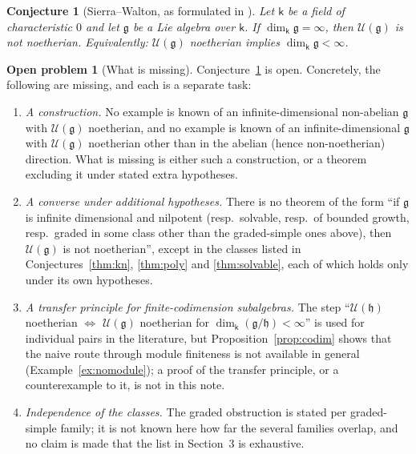 \documentclass[11pt]{ctexart}
\theoremstyle{plain}
\newtheorem{conjecture}[theorem]{Conjecture}
\theoremstyle{definition}
\newtheorem{openproblem}[theorem]{Open problem}
\theoremstyle{remark}
\newcommand{\kk}{\mathsf{k}}
\newcommand{\gl}{\mathfrak{g}}
\newcommand{\hl}{\mathfrak{h}}
\newcommand{\UU}{\mathcal{U}}
\begin{document}
\begin{conjecture}[Sierra--Walton, as formulated in \cite{SW14}]\label{conj:SW}
Let $\kk$ be a field of characteristic $0$ and let $\gl$ be a Lie algebra over $\kk$.
If $\dim_\kk\gl=\infty$, then $\UU(\gl)$ is not noetherian. Equivalently: $\UU(\gl)$
noetherian implies $\dim_\kk\gl<\infty$.
\end{conjecture}

\begin{openproblem}[What is missing]\label{op:missing}
Conjecture~\ref{conj:SW} is open. Concretely, the following are missing, and each is a
separate task:
\begin{enumerate}
\item[(1)] \emph{A construction.} No example is known of an infinite-dimensional
non-abelian $\gl$ with $\UU(\gl)$ noetherian, and no example is known of an
infinite-dimensional $\gl$ with $\UU(\gl)$ noetherian other than in the abelian
(hence non-noetherian) direction. What is missing is either such a construction, or a
theorem excluding it under stated extra hypotheses.
\item[(2)] \emph{A converse under additional hypotheses.} There is no theorem of the
form ``if $\gl$ is infinite dimensional and nilpotent (resp.\ solvable, resp.\ of
bounded growth, resp.\ graded in some class other than the graded-simple ones above),
then $\UU(\gl)$ is not noetherian'', except in the classes listed in
Conjectures~\ref{thm:kn}, \ref{thm:poly} and \ref{thm:solvable}, each of which holds only
under its own hypotheses.
\item[(3)] \emph{A transfer principle for finite-codimension subalgebras.} The step
``$\UU(\hl)$ noetherian $\Leftrightarrow$ $\UU(\gl)$ noetherian for
$\dim_\kk(\gl/\hl)<\infty$'' is used for individual pairs in the literature, but
Proposition~\ref{prop:codim} shows that the naive route through module finiteness is
not available in general (Example~\ref{ex:nomodule}); a proof of the transfer
principle, or a counterexample to it, is not in this note.
\item[(4)] \emph{Independence of the classes.} The graded obstruction is stated per
graded-simple family; it is not known here how far the several families overlap, and
no claim is made that the list in Section~3 is exhaustive.
\end{enumerate}
\end{openproblem}
\end{document}
